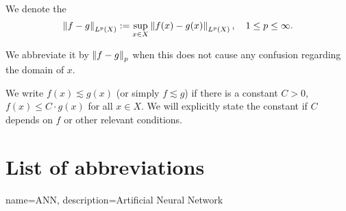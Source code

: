 We denote the 
\begin{equation*}
    \left\| f - g \right\|_{L^{p}(X)} := 
    \sup_{x \in X} \left\| f(x) - g(x) \right\|_{L^{p}(X)}, \quad 1 \leq p \leq \infty.
\end{equation*}

We abbreviate it by $\left\| f - g \right\|_{p}$ when this does not cause any confusion
regarding the domain of $x$.

We write $f(x) \lesssim g(x)$ (or simply $f \lesssim g$) if there is a constant
$C>0$, $f(x) \leq C \cdot g(x)$ for all $x \in X$. We will explicitly state the
constant if $C$ depends on $f$ or other relevant conditions.

\section*{List of abbreviations}

\printglossary

{
    name=ANN,
    description={Artificial Neural Network}
}






